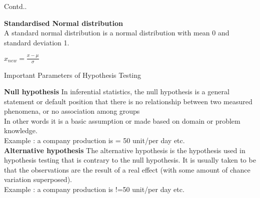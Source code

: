\documentclass{beamer}
\begin{document}
\begin{frame}{Contd..}
\begin{flushleft}
	\textbf{Standardised Normal distribution}
\\
\vspace{10pt}
				A standard normal distribution is a normal distribution with mean 0 and standard deviation 1.
	\end{flushleft}
	$x_{new} = \frac{x-\mu}{\sigma}$
\end{frame}

\begin{frame}{Important Parameters of Hypothesis Testing}
\begin{flushleft}
	\textbf{Null hypothesis}
	In inferential statistics, the null hypothesis is a general statement or default position that there is no relationship between two measured phenomena, or no association among groups
\\
\vspace{10pt}
				In other words it is a basic assumption or made based on domain or problem knowledge.
	\\
\vspace{10pt}			
Example : a company production is = 50 unit/per day etc.
	\\
\vspace{10pt}	
	\textbf{Alternative hypothesis}
	The alternative hypothesis is the hypothesis used in hypothesis testing that is contrary to the null hypothesis. It is usually taken to be that the observations are the result of a real effect (with some amount of chance variation superposed).
\\
\vspace{10pt}
				Example : a company production is !=50 unit/per day etc.
	\end{flushleft}
\end{frame}
\end{document}
